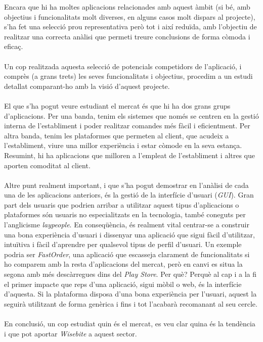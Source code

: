 Encara que hi ha moltes aplicacions relacionades amb aquest àmbit (si bé, amb objectius i funcionalitats molt diverses, en alguns casos molt dispars al projecte), s'ha fet una selecció prou representativa però tot i així reduïda, amb l'objectiu de realitzar una correcta anàlisi que permeti treure conclusions de forma còmoda i eficaç.
\\\\
Un cop realitzada aquesta selecció de potencials competidors de l'aplicació, i comprès (a grans trets) les seves funcionalitats i objectius, procedim a un estudi detallat comparant-ho amb la visió d'aquest projecte.
\\\\
El que s'ha pogut veure estudiant el mercat és que hi ha dos grans grups d'aplicacions. Per una banda, tenim els sistemes que només se centren en la gestió interna de l'establiment i poder realitzar comandes més fàcil i eficientment. Per altra banda, tenim les plataformes que permeten al client, que acudeix a l'establiment, viure una millor experiència i estar còmode en la seva estança. Resumint, hi ha aplicacions que milloren a l'empleat de l'establiment i altres que aporten comoditat al client.
\\\\
Altre punt realment important, i que s'ha pogut demostrar en l'anàlisi de cada una de les aplicacions anteriors, és la gestió de la interfície d'usuari (\textit{GUI}). Gran part dels usuaris que podrien arribar a utilitzar aquest tipus d'aplicacions o plataformes són usuaris no especialitzats en la tecnologia, també coneguts per l'anglicisme \textit{laypeople}. En conseqüència, és realment vital centrar-se a construir una bona experiència d'usuari i dissenyar una aplicació que sigui fàcil d'utilitzar, intuïtiva i fàcil d'aprendre per qualsevol tipus de perfil d'usuari. Un exemple podria ser \textit{FastOrder}, una aplicació que escasseja clarament de funcionalitats si ho comparem amb la resta d'aplicacions del mercat, però en canvi es situa la segona amb més descàrregues dins del \textit{Play Store}. Per què? Perquè al cap i a la fi el primer impacte que reps d'una aplicació, sigui mòbil o web, és la interfície d'aquesta. Si la plataforma disposa d'una bona experiència per l'usuari, aquest la seguirà utilitzant de forma genèrica i fins i tot l'acabarà recomanant al seu cercle.
\\\\
En conclusió, un cop estudiat quin és el mercat, es veu clar quina és la tendència i que pot aportar \textit{Wisebite} a aquest sector.
